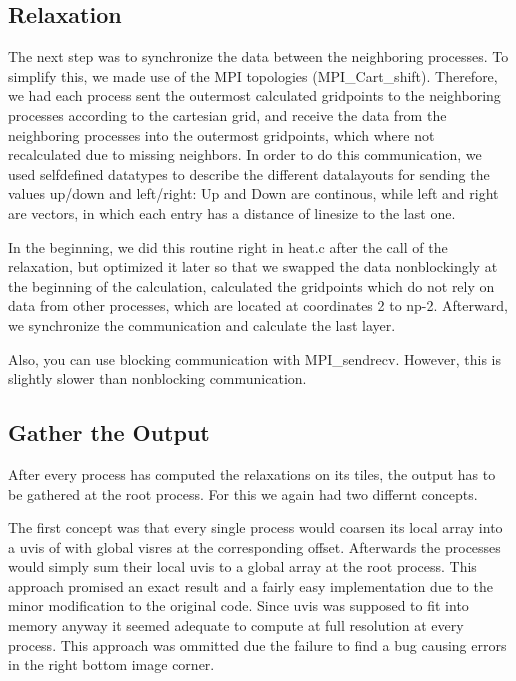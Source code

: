 \subsection*{Relaxation}

The next step was to synchronize the data between the neighboring processes. To simplify this, we made use of the MPI topologies (MPI\_Cart\_shift). 
Therefore, we had each process sent the outermost calculated gridpoints to the neighboring processes according to the cartesian grid, and receive the data from the neighboring processes into the outermost gridpoints, which where not recalculated due to missing neighbors. 
In order to do this communication, we used selfdefined datatypes to describe the different datalayouts for sending the values up/down and left/right: 
Up and Down are continous, while left and right are vectors, in which each entry has a distance of linesize to the last one.

In the beginning, we did this routine right in heat.c after the call of the relaxation, but optimized it later so that we swapped the data nonblockingly at the beginning of the calculation, calculated the gridpoints which do not rely on data from other processes, which are located at coordinates 2 to np-2.
Afterward, we synchronize the communication and calculate the last layer.

Also, you can use blocking communication with MPI\_sendrecv. However, this is slightly slower than nonblocking communication.

\subsection*{Gather the Output}

After every process has computed the relaxations on its tiles, the output has to be gathered at the root process. For this we again had two differnt concepts.

The first concept was that every single process would coarsen its local array into a uvis of with global visres at the corresponding offset. 
Afterwards the processes would simply sum their local uvis to a global array at the root process. 
This approach promised an exact result and a fairly easy implementation due to the minor modification to the original code. 
Since uvis was supposed to fit into memory anyway it seemed adequate to compute at full resolution at every process. 
This approach was ommitted due the failure to find a bug causing errors in the right bottom image corner.

